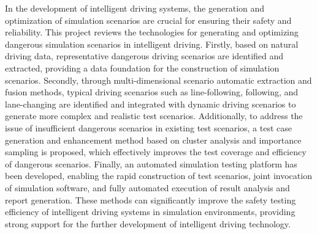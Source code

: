\begin{abstracten}

In the development of intelligent driving systems, the generation and optimization of simulation scenarios are crucial for ensuring their safety and reliability. This project reviews the technologies for generating and optimizing dangerous simulation scenarios in intelligent driving. Firstly, based on natural driving data, representative dangerous driving scenarios are identified and extracted, providing a data foundation for the construction of simulation scenarios. Secondly, through multi-dimensional scenario automatic extraction and fusion methods, typical driving scenarios such as line-following, following, and lane-changing are identified and integrated with dynamic driving scenarios to generate more complex and realistic test scenarios. Additionally, to address the issue of insufficient dangerous scenarios in existing test scenarios, a test case generation and enhancement method based on cluster analysis and importance sampling is proposed, which effectively improves the test coverage and efficiency of dangerous scenarios. Finally, an automated simulation testing platform has been developed, enabling the rapid construction of test scenarios, joint invocation of simulation software, and fully automated execution of result analysis and report generation. These methods can significantly improve the safety testing efficiency of intelligent driving systems in simulation environments, providing strong support for the further development of intelligent driving technology.



\end{abstracten}
